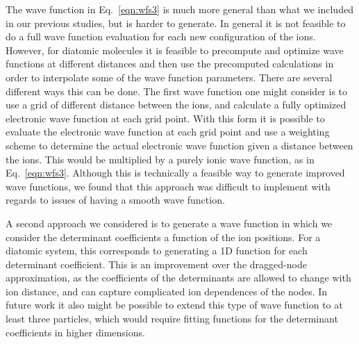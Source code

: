 \documentclass[aip,jcp,numerical,reprint]{revtex4-1}
\begin{document}
The wave function in Eq.~\eqref{eqn:wfs3} is much more general than what we included in our previous studies, but is harder to generate.  In general it is not feasible to do a full wave function evaluation for each new configuration of the ions.  However, for diatomic molecules it is feasible to precompute and optimize wave functions at different distances and then use the precomputed calculations in order to interpolate some of the  wave function parameters.  There are several different ways this can be done.   The first wave function one might consider is to use a grid of different distance between the ions, and calculate a fully optimized electronic wave function at each grid point.  With this form it is possible to evaluate the electronic wave function at each grid point and use a weighting scheme to determine the actual electronic wave function given a distance between the ions.  This would be multiplied by a purely ionic wave function, as in Eq.~\eqref{eqn:wfs3}. Although this is technically a feasible way to generate improved wave functions,  we found that this approach was difficult to implement with regards to issues of having a smooth wave function.   

A second approach we considered is to generate a wave function in which we consider the determinant coefficients a function of the ion positions.  For a diatomic system, this corresponds to generating a 1D function for each determinant coefficient.  This is an improvement over the dragged-node approximation, as the coefficients of the determinants are allowed to change with ion distance, and can capture complicated ion dependences of the nodes.  In future work it also might be possible to extend this type of wave function to at least three particles, which would require fitting functions for the determinant coefficients in higher dimensions.  





\end{document}
